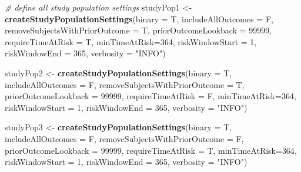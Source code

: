 \documentclass[]{article}
\newenvironment{Shaded}{\begin{snugshade}}{\end{snugshade}}
\newcommand{\KeywordTok}[1]{\textcolor[rgb]{0.13,0.29,0.53}{\textbf{#1}}}
\newcommand{\DataTypeTok}[1]{\textcolor[rgb]{0.13,0.29,0.53}{#1}}
\newcommand{\DecValTok}[1]{\textcolor[rgb]{0.00,0.00,0.81}{#1}}
\newcommand{\StringTok}[1]{\textcolor[rgb]{0.31,0.60,0.02}{#1}}
\newcommand{\CommentTok}[1]{\textcolor[rgb]{0.56,0.35,0.01}{\textit{#1}}}
\newcommand{\NormalTok}[1]{#1}
\begin{document}
\begin{Shaded}
\begin{Highlighting}[]
\CommentTok{# define all study population settings}
\NormalTok{studyPop1 <-}\StringTok{ }\KeywordTok{createStudyPopulationSettings}\NormalTok{(}\DataTypeTok{binary =}\NormalTok{ T,}
                                          \DataTypeTok{includeAllOutcomes =}\NormalTok{ F,}
                                          \DataTypeTok{removeSubjectsWithPriorOutcome =}\NormalTok{ T,}
                                          \DataTypeTok{priorOutcomeLookback =} \DecValTok{99999}\NormalTok{,}
                                          \DataTypeTok{requireTimeAtRisk =}\NormalTok{ T,}
                                          \DataTypeTok{minTimeAtRisk=}\DecValTok{364}\NormalTok{,}
                                          \DataTypeTok{riskWindowStart =} \DecValTok{1}\NormalTok{,}
                                          \DataTypeTok{riskWindowEnd =} \DecValTok{365}\NormalTok{,}
                                          \DataTypeTok{verbosity =} \StringTok{"INFO"}\NormalTok{)}

\NormalTok{studyPop2 <-}\StringTok{ }\KeywordTok{createStudyPopulationSettings}\NormalTok{(}\DataTypeTok{binary =}\NormalTok{ T,}
                                           \DataTypeTok{includeAllOutcomes =}\NormalTok{ F,}
                                           \DataTypeTok{removeSubjectsWithPriorOutcome =}\NormalTok{ T,}
                                           \DataTypeTok{priorOutcomeLookback =} \DecValTok{99999}\NormalTok{,}
                                           \DataTypeTok{requireTimeAtRisk =}\NormalTok{ F,}
                                           \DataTypeTok{minTimeAtRisk=}\DecValTok{364}\NormalTok{,}
                                           \DataTypeTok{riskWindowStart =} \DecValTok{1}\NormalTok{,}
                                           \DataTypeTok{riskWindowEnd =} \DecValTok{365}\NormalTok{,}
                                           \DataTypeTok{verbosity =} \StringTok{"INFO"}\NormalTok{)}

\NormalTok{studyPop3 <-}\StringTok{ }\KeywordTok{createStudyPopulationSettings}\NormalTok{(}\DataTypeTok{binary =}\NormalTok{ T,}
                                           \DataTypeTok{includeAllOutcomes =}\NormalTok{ F,}
                                           \DataTypeTok{removeSubjectsWithPriorOutcome =}\NormalTok{ F,}
                                           \DataTypeTok{priorOutcomeLookback =} \DecValTok{99999}\NormalTok{,}
                                           \DataTypeTok{requireTimeAtRisk =}\NormalTok{ T,}
                                           \DataTypeTok{minTimeAtRisk=}\DecValTok{364}\NormalTok{,}
                                           \DataTypeTok{riskWindowStart =} \DecValTok{1}\NormalTok{,}
                                           \DataTypeTok{riskWindowEnd =} \DecValTok{365}\NormalTok{,}
                                           \DataTypeTok{verbosity =} \StringTok{"INFO"}\NormalTok{)}
                                           

\end{Highlighting}
\end{Shaded}
\end{document}
